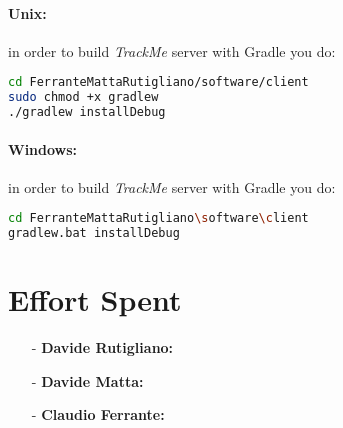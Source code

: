 \documentclass[a4paper]{article}
\begin{document}
\paragraph{Unix:} in order to build \textit{TrackMe} server with Gradle you do:

\begin{lstlisting}[language=bash]
cd FerranteMattaRutigliano/software/client
sudo chmod +x gradlew
./gradlew installDebug
\end{lstlisting}

\paragraph{Windows:} in order to build \textit{TrackMe} server with Gradle you do:

\begin{lstlisting}[language=bash]
cd FerranteMattaRutigliano\software\client
gradlew.bat installDebug
\end{lstlisting}

\newpage
\section{Effort Spent}
    \begin{itemize}
        \item[-] \textbf{Davide Rutigliano: }
        
        \item[-] \textbf{Davide Matta: }
        
        \item[-] \textbf{Claudio Ferrante: }
    \end{itemize}
\end{document}
